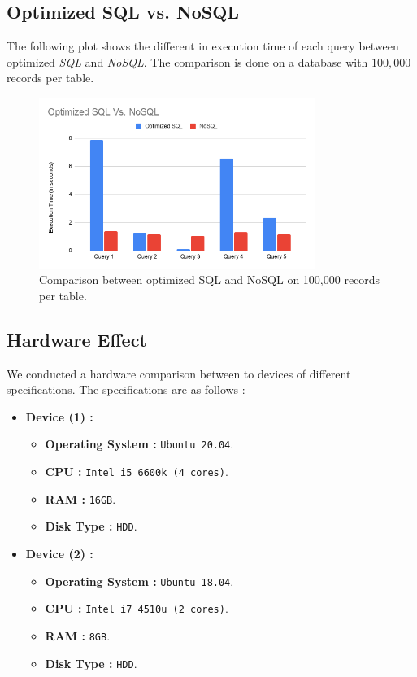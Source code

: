 \subsection{Optimized SQL vs. NoSQL}
The following plot shows the different in execution time of each query between optimized \emph{SQL} and \emph{NoSQL}. The comparison is done on a database with $100,000$ records per table.
\begin{figure}[H]
    \centering
    \includegraphics[width=0.8\textwidth]{images/stats/sql-vs-nosql.png}
    \caption{Comparison between optimized SQL and NoSQL on 100,000 records per table.}
    \label{fig:db-size-2}
\end{figure}

\subsection{Hardware Effect}
We conducted a hardware comparison between to devices of different specifications. The specifications are as follows :
\begin{itemize}
    \item \textbf{Device (1) :}
    \begin{itemize}
        \item \textbf{Operating System :} \texttt{Ubuntu 20.04}.
        \item \textbf{CPU :} \texttt{Intel i5 6600k (4 cores)}.
        \item \textbf{RAM :} \texttt{16GB}.
        \item \textbf{Disk Type :} \texttt{HDD}.
    \end{itemize}
    \item \textbf{Device (2) :}
    \begin{itemize}
        \item \textbf{Operating System :} \texttt{Ubuntu 18.04}.
        \item \textbf{CPU :} \texttt{Intel i7 4510u (2 cores)}.
        \item \textbf{RAM :} \texttt{8GB}.
        \item \textbf{Disk Type :} \texttt{HDD}.
    \end{itemize}
\end{itemize}

